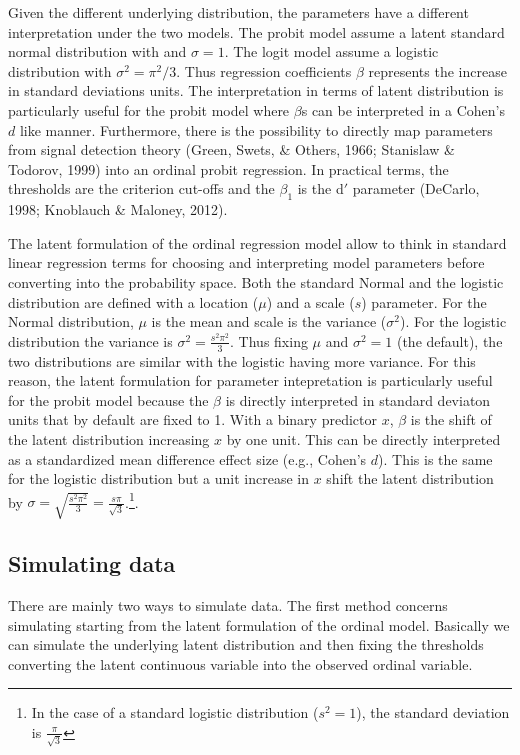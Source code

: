 \documentclass[
  man,floatsintext]{apa6}
\begin{document}
Given the different underlying distribution, the parameters have a different interpretation under the two models. The probit model assume a latent standard normal distribution with and \(\sigma = 1\). The logit model assume a logistic distribution with \(\sigma^2 = \pi^2/3\). Thus regression coefficients \(\beta\) represents the increase in standard deviations units. The interpretation in terms of latent distribution is particularly useful for the probit model where \(\beta\)s can be interpreted in a Cohen's \(d\) like manner. Furthermore, there is the possibility to directly map parameters from signal detection theory (Green, Swets, \& Others, 1966; Stanislaw \& Todorov, 1999) into an ordinal probit regression. In practical terms, the thresholds are the criterion cut-offs and the \(\beta_1\) is the d\('\) parameter (DeCarlo, 1998; Knoblauch \& Maloney, 2012).

The latent formulation of the ordinal regression model allow to think in standard linear regression terms for choosing and interpreting model parameters before converting into the probability space. Both the standard Normal and the logistic distribution are defined with a location (\(\mu\)) and a scale (\(s\)) parameter. For the Normal distribution, \(\mu\) is the mean and scale is the variance (\(\sigma^2\)). For the logistic distribution the variance is \(\sigma^2=\frac{s^2\pi^2}{3}\). Thus fixing \(\mu\) and \(\sigma^2 = 1\) (the default), the two distributions are similar with the logistic having more variance. For this reason, the latent formulation for parameter intepretation is particularly useful for the probit model because the \(\beta\) is directly interpreted in standard deviaton units that by default are fixed to 1. With a binary predictor \(x\), \(\beta\) is the shift of the latent distribution increasing \(x\) by one unit. This can be directly interpreted as a standardized mean difference effect size (e.g., Cohen's \(d\)). This is the same for the logistic distribution but a unit increase in \(x\) shift the latent distribution by \(\sigma = \sqrt{\frac{s^2 \pi^2}{3}} = \frac{s\pi}{\sqrt{3}}\).\footnote{In the case of a standard logistic distribution (\(s^2 = 1\)), the standard deviation is \(\frac{\pi}{\sqrt{3}}\)}.

\subsection{Simulating data}\label{simulating-data}

There are mainly two ways to simulate data. The first method concerns simulating starting from the latent formulation of the ordinal model. Basically we can simulate the underlying latent distribution and then fixing the thresholds converting the latent continuous variable into the observed ordinal variable.
\end{document}
